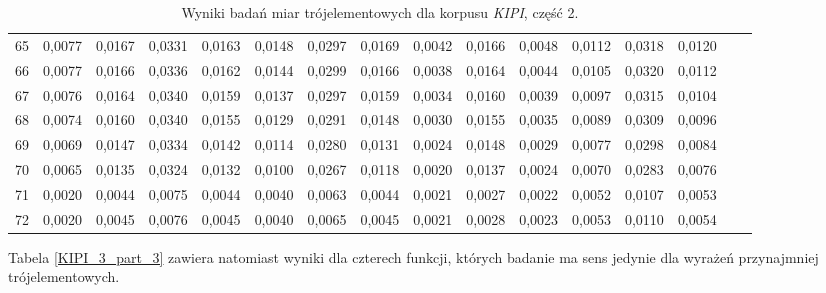 \begin{table}[htp!]
\begin{adjustwidth}{-1cm}{}
\begin{tabular}{ l | *{15}{| r}}
65	&	0,0077	&	0,0167	&	0,0331	&	0,0163	&	0,0148	&	0,0297	&	0,0169	&	0,0042	&	0,0166	&	0,0048	&	0,0112	&	0,0318	&	0,0120	\\
66	&	0,0077	&	0,0166	&	0,0336	&	0,0162	&	0,0144	&	0,0299	&	0,0166	&	0,0038	&	0,0164	&	0,0044	&	0,0105	&	0,0320	&	0,0112	\\
67	&	0,0076	&	0,0164	&	0,0340	&	0,0159	&	0,0137	&	0,0297	&	0,0159	&	0,0034	&	0,0160	&	0,0039	&	0,0097	&	0,0315	&	0,0104	\\
68	&	0,0074	&	0,0160	&	0,0340	&	0,0155	&	0,0129	&	0,0291	&	0,0148	&	0,0030	&	0,0155	&	0,0035	&	0,0089	&	0,0309	&	0,0096	\\
69	&	0,0069	&	0,0147	&	0,0334	&	0,0142	&	0,0114	&	0,0280	&	0,0131	&	0,0024	&	0,0148	&	0,0029	&	0,0077	&	0,0298	&	0,0084	\\
70	&	0,0065	&	0,0135	&	0,0324	&	0,0132	&	0,0100	&	0,0267	&	0,0118	&	0,0020	&	0,0137	&	0,0024	&	0,0070	&	0,0283	&	0,0076	\\
71	&	0,0020	&	0,0044	&	0,0075	&	0,0044	&	0,0040	&	0,0063	&	0,0044	&	0,0021	&	0,0027	&	0,0022	&	0,0052	&	0,0107	&	0,0053	\\
72	&	0,0020	&	0,0045	&	0,0076	&	0,0045	&	0,0040	&	0,0065	&	0,0045	&	0,0021	&	0,0028	&	0,0023	&	0,0053	&	0,0110	&	0,0054	\\
	\bottomrule
\end{tabular}
 \end{adjustwidth}
\caption[Wyniki badań miar trójelementowych dla korpusu \emph{KIPI}, część 2]{Wyniki badań miar trójelementowych dla korpusu \emph{KIPI}, część 2.}
\label{KIPI_3_part_2}
\end{table}

Tabela \ref{KIPI_3_part_3} zawiera natomiast wyniki dla czterech funkcji, których badanie ma sens jedynie dla wyrażeń przynajmniej trójelementowych.

